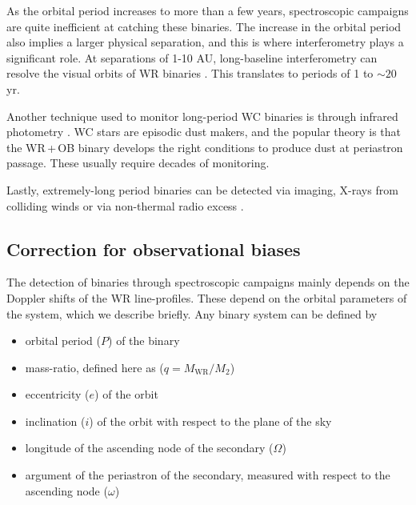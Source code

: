 As the orbital period increases to more than a few years, spectroscopic campaigns are quite inefficient at catching these binaries. The increase in the orbital period also implies a larger physical separation, and this is where interferometry plays a significant role. At separations of 1-10 AU, long-baseline interferometry can resolve the visual orbits of WR binaries \citep[e.g. for WR 113 and WR 140, respectively:][]{2021Richardson,thomas_orbit_2021}. This translates to periods of 1 to ${\sim}20\,$yr. 

Another technique used to monitor long-period WC binaries is through infrared photometry \citep{1995Williamsdust,1999MarchenkoDust,2001WilliamsDust,2005Williams,2019WilliamsNEOWISE}. WC stars are episodic dust makers, and the popular theory is that the WR\,+\,OB binary develops the right conditions to produce dust at periastron passage. These usually require decades of monitoring. 

Lastly, extremely-long period binaries can be detected via imaging, X-rays from colliding winds or via non-thermal radio excess \citep[e.g.][]{1996Dougherty, 2000Dougherty, 2017Zhekov,2020Rodriguez, 2020Zhekov}. 

\subsection{Correction for observational biases} \label{sect:obs_bias_intro}

The detection of binaries through spectroscopic campaigns mainly depends on the Doppler shifts of the WR line-profiles. These depend on the orbital parameters of the system, which we describe briefly. Any binary system can be defined by

\begin{itemize}
    \item orbital period ($P$) of the binary
    \item mass-ratio, defined here as ($q = M_{\textrm{WR}}/M_2$)
    \item eccentricity ($e$) of the orbit
    \item inclination ($i$) of the orbit with respect to the plane of the sky
    \item longitude of the ascending node of the secondary ($\Omega$)
    \item argument of the periastron of the secondary, measured with respect to the ascending node ($\omega$)
\end{itemize}

